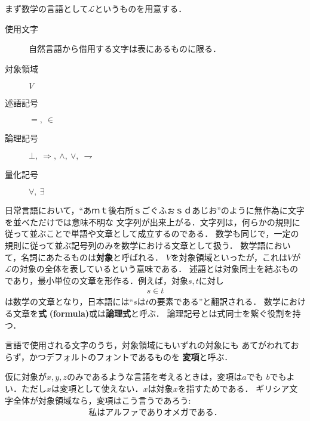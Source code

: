 	まず数学の言語として$\mathcal{L}$というものを用意する．
	\begin{description}
		\item[使用文字] 自然言語から借用する文字は表にあるものに限る．
		\item[対象領域] $V$
		\item[述語記号] $=,\ \in$
		\item[論理記号] $\bot,\ \Longrightarrow,\ \wedge,\ \vee,\ \rightharpoondown$
		\item[量化記号] $\forall,\ \exists$
	\end{description}
	
	日常言語において，``あｍｔ後右所ｓごぐふぉｓｄあじお''のように無作為に文字を並べただけでは意味不明な
	文字列が出来上がる．文字列は，何らかの規則に従って並ぶことで単語や文章として成立するのである．
	数学も同じで，一定の規則に従って並ぶ記号列のみを数学における文章として扱う．
	数学語において，名詞にあたるものは{\bf 対象}と呼ばれる．
	$V$を対象領域といったが，これは$V$が$\mathcal{L}$の対象の全体を表しているという意味である．
	述語とは対象同士を結ぶものであり，最小単位の文章を形作る．例えば，対象$s,t$に対し
	\begin{align}
		s \in t
	\end{align}
	は数学の文章となり，日本語には``$s$は$t$の要素である''と翻訳される．
	数学における文章を{\bf 式}
	{\bf (formula)}或は{\bf 論理式}と呼ぶ．
	論理記号とは式同士を繋ぐ役割を持つ．
	
	\begin{screen}
		\begin{dfn}[変項]
			言語で使用される文字のうち，対象領域にもいずれの対象にも
			あてがわれておらず，かつデフォルトのフォントであるものを
			{\bf 変項}と呼ぶ．
		\end{dfn}
	\end{screen}
	
	仮に対象が$x,y,z$のみであるような言語を考えるときは，変項は$a$でも
	$b$でもよい．ただし$x$は変項として使えない．$x$は対象$x$を指すためである．
	ギリシア文字全体が対象領域なら，変項はこう言うであろう:
	\begin{align}
		\mbox{私はアルファでありオメガである．}
	\end{align}
	
	
